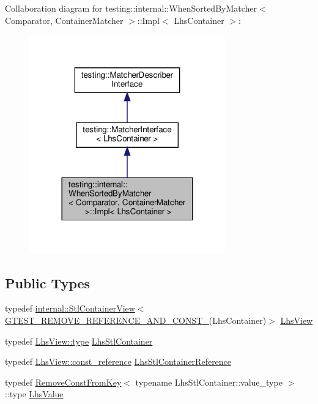 Collaboration diagram for testing\+:\+:internal\+:\+:When\+Sorted\+By\+Matcher$<$ Comparator, Container\+Matcher $>$\+:\+:Impl$<$ Lhs\+Container $>$\+:
\nopagebreak
\begin{figure}[H]
\begin{center}
\leavevmode
\includegraphics[width=240pt]{classtesting_1_1internal_1_1_when_sorted_by_matcher_1_1_impl__coll__graph}
\end{center}
\end{figure}
\subsection*{Public Types}
\begin{DoxyCompactItemize}
\item 
typedef \hyperlink{classtesting_1_1internal_1_1_stl_container_view}{internal\+::\+Stl\+Container\+View}$<$ \hyperlink{gtest-internal_8h_a874567b176266188fabfffb8393267ce}{G\+T\+E\+S\+T\+\_\+\+R\+E\+M\+O\+V\+E\+\_\+\+R\+E\+F\+E\+R\+E\+N\+C\+E\+\_\+\+A\+N\+D\+\_\+\+C\+O\+N\+S\+T\+\_\+}(Lhs\+Container)$>$ \hyperlink{classtesting_1_1internal_1_1_when_sorted_by_matcher_1_1_impl_a4c84fddfe1bf967a73e5dae1940db427}{Lhs\+View}
\item 
typedef \hyperlink{classtesting_1_1internal_1_1_stl_container_view_a2b2c63a6dcdbfe63fb0ee121ebf463ba}{Lhs\+View\+::type} \hyperlink{classtesting_1_1internal_1_1_when_sorted_by_matcher_1_1_impl_a2cb1a8d85ca2c376b6abdbcb00d84759}{Lhs\+Stl\+Container}
\item 
typedef \hyperlink{classtesting_1_1internal_1_1_stl_container_view_a9cd4f6ed689b3938cdb7b3c4cbf1b36b}{Lhs\+View\+::const\+\_\+reference} \hyperlink{classtesting_1_1internal_1_1_when_sorted_by_matcher_1_1_impl_ab5e53a762bb213ccf84299b31c825b58}{Lhs\+Stl\+Container\+Reference}
\item 
typedef \hyperlink{structtesting_1_1internal_1_1_remove_const_from_key}{Remove\+Const\+From\+Key}$<$ typename Lhs\+Stl\+Container\+::value\+\_\+type $>$\+::type \hyperlink{classtesting_1_1internal_1_1_when_sorted_by_matcher_1_1_impl_a93044f4ba53373fcfc424132b5e6c462}{Lhs\+Value}
\end{DoxyCompactItemize}
